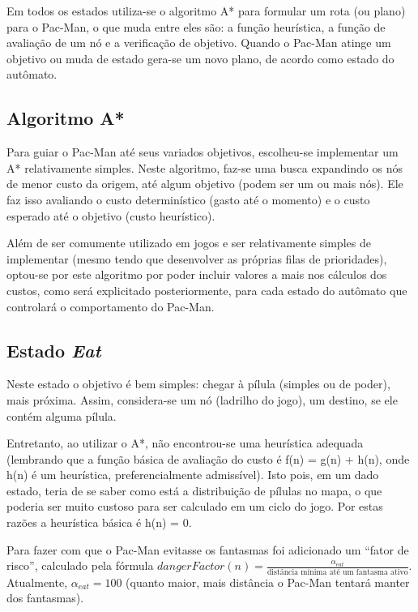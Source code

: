 \documentclass[a4paper]{scrartcl}
\begin{document}
Em todos os estados utiliza-se o algoritmo A* para formular um rota (ou plano) para o Pac-Man,
o que muda entre eles são: a função heurística, a função de avaliação de um nó e a verificação
de objetivo. Quando o Pac-Man atinge um objetivo ou muda de estado gera-se um novo plano, de acordo como estado do autômato.

\subsection{Algoritmo A*}

Para guiar o Pac-Man até seus variados objetivos, escolheu-se implementar um A* relativamente simples. Neste algoritmo, faz-se uma busca expandindo os nós de menor custo da origem, até algum
objetivo (podem ser um ou mais nós). Ele faz isso avaliando o custo determinístico (gasto até o momento) e o custo esperado até o objetivo (custo heurístico).

Além de ser comumente utilizado em jogos e ser relativamente simples de implementar 
(mesmo tendo que desenvolver as próprias filas de prioridades), optou-se por este algoritmo por
poder incluir valores a mais nos cálculos dos custos, como será explicitado posteriormente, para
cada estado do autômato que controlará o comportamento do Pac-Man.

\subsection{Estado \textit{Eat}}

Neste estado o objetivo é bem simples: chegar à pílula (simples ou de poder), mais próxima.
Assim, considera-se um nó (ladrilho do jogo), um destino, se ele contém alguma pílula.

Entretanto, ao utilizar o A*, não encontrou-se uma heurística adequada (lembrando
que a função básica de avaliação do custo é f(n) = g(n) + h(n), onde h(n) é um heurística,
preferencialmente admissível). Isto pois, em um dado estado, teria de se saber como está a
distribuição de pílulas no mapa, o que poderia ser muito custoso para ser calculado em
um ciclo do jogo. Por estas razões a heurística básica é h(n) = 0.

Para fazer com que o Pac-Man evitasse os fantasmas foi adicionado um ``fator de risco'',
calculado pela fórmula $dangerFactor(n) =  \frac{\alpha_{eat}}{\text{distância mínima até um fantasma ativo}}$. Atualmente, $\alpha_{eat} = 100$ (quanto maior, mais distância o Pac-Man
tentará manter dos fantasmas).
\end{document}
